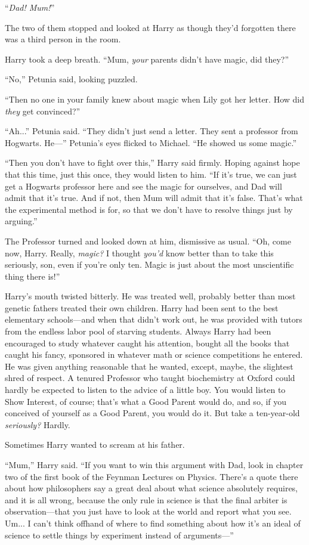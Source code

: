 “\emph{Dad! Mum!}”

The two of them stopped and looked at Harry as though they’d forgotten there was a third person in the room.

Harry took a deep breath. “Mum, \emph{your} parents didn’t have magic, did they?”

“No,” Petunia said, looking puzzled.

“Then no one in your family knew about magic when Lily got her letter. How did \emph{they} get convinced?”

“Ah...” Petunia said. “They didn’t just send a letter. They sent a professor from Hogwarts. He—” Petunia’s eyes flicked to Michael. “He showed us some magic.”

“Then you don’t have to fight over this,” Harry said firmly. Hoping against hope that this time, just this once, they would listen to him. “If it’s true, we can just get a Hogwarts professor here and see the magic for ourselves, and Dad will admit that it’s true. And if not, then Mum will admit that it’s false. That’s what the experimental method is for, so that we don’t have to resolve things just by arguing.”

The Professor turned and looked down at him, dismissive as usual. “Oh, come now, Harry. Really, \emph{magic?} I thought \emph{you’d} know better than to take this seriously, son, even if you’re only ten. Magic is just about the most unscientific thing there is!”

Harry’s mouth twisted bitterly. He was treated well, probably better than most genetic fathers treated their own children. Harry had been sent to the best elementary schools—and when that didn’t work out, he was provided with tutors from the endless labor pool of starving students. Always Harry had been encouraged to study whatever caught his attention, bought all the books that caught his fancy, sponsored in whatever math or science competitions he entered. He was given anything reasonable that he wanted, except, maybe, the slightest shred of respect. A tenured Professor who taught biochemistry at Oxford could hardly be expected to listen to the advice of a little boy. You would listen to Show Interest, of course; that’s what a Good Parent would do, and so, if you conceived of yourself as a Good Parent, you would do it. But take a ten-year-old \emph{seriously?} Hardly.

Sometimes Harry wanted to scream at his father.

“Mum,” Harry said. “If you want to win this argument with Dad, look in chapter two of the first book of the Feynman Lectures on Physics. There’s a quote there about how philosophers say a great deal about what science absolutely requires, and it is all wrong, because the only rule in science is that the final arbiter is observation—that you just have to look at the world and report what you see. Um... I can’t think offhand of where to find something about how it’s an ideal of science to settle things by experiment instead of arguments—”

